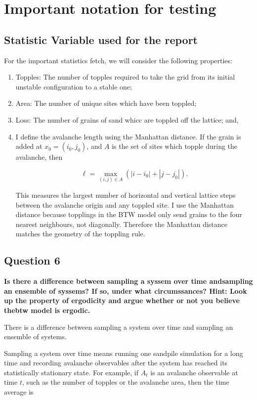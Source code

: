 \chapter{Important notation for testing}\label{ch:introduction2}

\section{Statistic Variable used for the report}\label{sec:vardef}
For the important statistics fetch, we will consider the following properties:
\begin{enumerate}[label=(\roman*)]
	\item Topples: The number of topples required to take the grid from its initial unstable configuration to a stable one;
	\item Area: The number of unique sites which have been toppled;
	\item Loss: The number of grains of sand whicc are toppled off the lattice; and,
	\item I define the avalanche length using the Manhattan distance. If the grain is added at \(x_0=(i_0,j_0)\), and \(A\) is the set of sites which topple during the avalanche, then

\[
\ell
=
\max_{(i,j)\in A}
\left(
|i-i_0|+|j-j_0|
\right).
\]

This measures the largest number of horizontal and vertical lattice steps between the avalanche origin and any toppled site. I use the Manhattan distance
because topplings in the BTW model only send grains to the four nearest neighbours, not diagonally. Therefore the Manhattan distance matches the geometry of the toppling rule.
\end{enumerate}


\section*{Question 6}

\textbf{Is there a difference between sampling a syssem over time andsampling an ensemble of syssems? If so, under what circumssances? Hint: Look up the property of ergodicity and argue whether or not you believe thebtw model is ergodic.}

There is a difference between sampling a system over time and sampling an ensemble of systems.

Sampling a system over time means running one sandpile simulation for a long time and recording avalanche observables after the system has reached its statistically stationary state. For example, if \(A_t\) is an avalanche observable at time \(t\), such as the number of topples or the avalanche area, then the time average is

